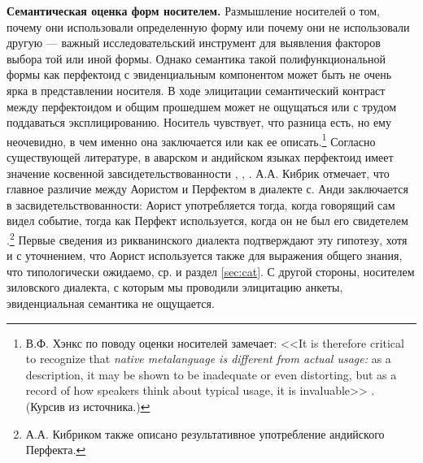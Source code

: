 \par \textbf{Семантическая оценка форм носителем.} Размышление носителей о том, почему они использовали определенную форму или почему они не использовали другую --- важный исследовательский инструмент для выявления факторов выбора той или иной формы. Однако семантика такой полифункциональной формы как перфектоид с эвиденциальным компонентом может быть не очень ярка в представлении носителя. В ходе элицитации семантический контраст между перфектоидом и общим прошедшем может не ощущаться или с трудом поддаваться эксплицированию. Носитель чувствует, что разница есть, но ему неочевидно, в чем именно она заключается или как ее описать.\footnote{В.Ф. Хэнкс по поводу оценки носителей замечает: <<It is therefore critical to recognize that \textit{native metalanguage is different from actual usage:} as a description, it may be shown to be inadequate or even distorting, but as a record of how speakers think about typical usage, it is invaluable>> \citep[18]{hanks2009}. (Курсив из источника.)} Согласно существующей литературе, в аварском и андийском языках перфектоид имеет значение косвенной завсидетельствованности \citep{mallaeva2007}, \citep{forker2018evidavar}, \citep{kibrik1985}. А.А. Кибрик отмечает, что главное различие между Аористом и Перфектом в диалекте с. Анди заключается в засвидетельствованности: Аорист употребляется тогда, когда говорящий сам видел событие, тогда как Перфект используется, когда он не был его свидетелем \citep{kibrik1985}.\footnote{А.А. Кибриком также описано результативное употребление андийского Перфекта.} Первые сведения из рикванинского диалекта подтверждают эту гипотезу, хотя и с уточнением, что Аорист используется также для выражения общего знания, что типологически ожидаемо, ср. \citep{verhees2018} и раздел \ref{sec:cat}. С другой стороны, носителем зиловского диалекта, с которым мы проводили элицитацию анкеты, эвиденциальная семантика не ощущается. 
